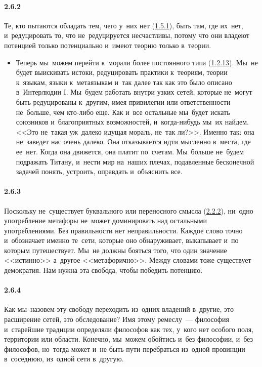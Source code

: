\paragraph{2.6.2}\hypertarget{par:2.6.2}{} Те, кто пытаются обладать тем, чего у~них нет (\hyperlink{par:1.5.1}{1.5.1}), быть там, где их~нет, и~редуцировать то, что не~редуцируется несчастливы, потому что они владеют потенцией только потенциально и~имеют теорию только в~теории.
	\begin{itemize}
	\item 
	Теперь мы~можем перейти к~морали более постоянного типа (\hyperlink{par:1.2.13}{1.2.13}). Мы~не будет выискивать истоки, редуцировать практики к~теориям, теории к~языкам, языки к~метаязыкам и~так далее так как это было описано в~Интерлюдии I. Мы~будем работать внутри узких сетей, которые не~могут быть редуцированы к~другим, имея привилегии или ответственности не~больше, чем кто-либо еще. Как и~все остальные мы~будет искать союзников и~благоприятных возможностей, и~когда-нибудь мы~их найдем. <<Это не~такая уж~далеко идущая мораль, не~так ли?>>. Именно так: она не~заведет нас очень далеко. Она отказывается идти мысленно в~места, где ее~нет. Когда она движется, она платит по~счетам. Мы~больше не~будем подражать Титану, и~нести мир на~наших плечах, подавленные бесконечной задачей понять, устроить, оправдать и~объяснить все.
	\end{itemize}

\paragraph{2.6.3}\hypertarget{par:2.6.3}{} Поскольку не~существует буквального или переносного смысла (\hyperlink{par:2.2.2}{2.2.2}), ни~одно употребление метафоры не~может доминировать над остальными употреблениями. Без правильности нет неправильности. Каждое слово точно и~обозначает именно те~сети, которые оно обнаруживает, выкапывает и~по которым путешествует. Мы~не должны бояться того, что один значение <<истинно>> а~другое <<метафорично>>. Между словами тоже существует демократия. Нам нужна эта свобода, чтобы победить потенцию.

\paragraph{2.6.4}\hypertarget{par:2.6.4}{} Как мы~назовем эту свободу переходить из~одних владений в~другие, это расширение сетей, это обследование? Имя этому ремеслу~--- философия и~старейшие традиции определяли философов как тех, у~кого нет особого поля, территории или области. 
Конечно, мы~можем обойтись и~без философии, и~без философов, но~тогда может и~не быть пути перебраться из~одной провинции в~соседнюю, из~одной сети в~другую.

